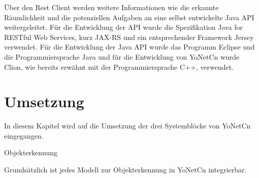 Über den Rest Client werden weitere Informationen wie die erkannte Räumlichkeit und die potenziellen Aufgaben an eine selbst entwickelte Java API weitergeleitet. Für die Entwicklung der API wurde die Spezifikation Java for RESTful Web Services, kurz JAX-RS und ein entsprechender Framework Jersey verwendet. 
Für die Entwicklung der Java API wurde das Programm Eclipse und die Programmiersprache Java und für die Entwicklung von YoNetCn wurde Clion, wie bereits erwähnt mit der Programmiersprache C++, verwendet. 


\section{Umsetzung}
\label{sec:umsetzung}

In diesem Kapitel wird auf die Umsetzung der drei Systemblöcke von YoNetCn eingegangen. 

Objekterkennung

Grundsätzlich ist jedes Modell zur Objekterkennung in YoNetCn integrierbar. 







